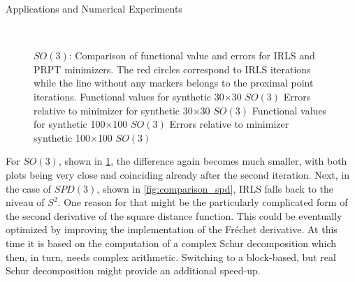 \begin{chapter}{Applications and Numerical Experiments}
\begin{figure}[h!]
{    }
    \\
    \caption[Comparison IRLS \& PRPT for Euclidean $SO(3)$]{$SO(3)$: Comparison of functional value and errors for IRLS and PRPT minimizers.
	The red circles correspond to IRLS iterations while the line without any markers belongs to the proximal point iterations.
	 Functional values for synthetic 30$\times$30 $SO(3)$
	  Errors relative to minimizer for synthetic 30$\times$30 $SO(3)$
	  Functional values for synthetic 100$\times$100 $SO(3)$
	  Errors relative to minimizer synthetic 100$\times$100 $SO(3)$
	\label{fig:comparison_son}
    }
\end{figure}

For $SO(3)$, shown in \ref{fig:comparison_son}, the difference again becomes much smaller, with both plots being very close and coinciding already after the second iteration. 
Next, in the case of $SPD(3)$, shown in \ref{fig:comparison_spd}, IRLS falls back to the niveau of $S^2$. One reason for that might be the particularly complicated form of the second
derivative of the square distance function. This could be eventually optimized by improving the implementation of the Fr\'{e}chet derivative. At this time it is based on
the computation of a complex Schur decomposition which then, in turn, needs complex arithmetic. Switching to a block-based, but real Schur decomposition might provide an additional speed-up.


\end{chapter}
